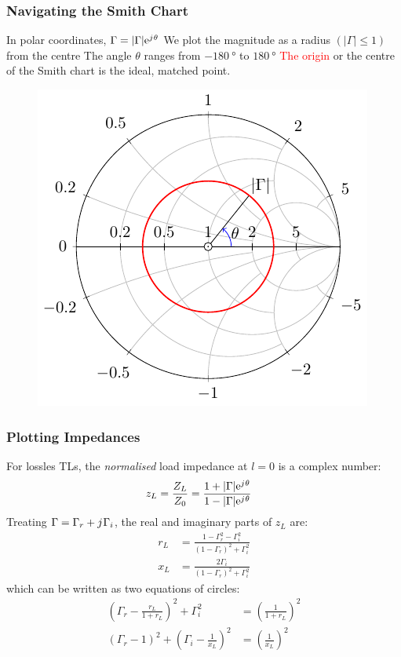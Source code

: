 \documentclass[10pt, compress]{beamer}
\newcommand{\e}{\mathrm{e}} %
\renewcommand{\j}{{j}\mkern1mu} %
\begin{document}
\begin{frame}
    \frametitle{Navigating the Smith Chart}
    \begin{outline}
        \1 In polar coordinates, $\Gamma = |\Gamma| \e^{\j \theta}$
        \1 We plot the magnitude as a radius $(|\Gamma| \le 1)$ from the centre
        \1 The angle $\theta$ ranges from $\SI{-180}{\degree}$ to $\SI{180}{\degree}$
        \1 \textcolor{red}{The origin} or the centre of the Smith chart is the ideal, matched point.
    \end{outline}
    \begin{figure}[htbp]
        \centering
        \includegraphics[width=.5\textwidth]{smith_simple_gamme.pdf}
    \end{figure}
\end{frame}

\begin{frame}
    \frametitle{Plotting Impedances}
    For lossles TLs, the \textit{normalised} load impedance at $l = 0$ is a complex number:
    \begin{align*}
        z_L  = \frac{Z_L}{Z_0} & = \frac{1 + |\Gamma|\e^{\j \theta}}{1 - |\Gamma|\e^{\j \theta}}
    \end{align*}
    Treating $\Gamma = \Gamma_r + \j \Gamma_i$, the real and imaginary parts of $z_L$ are:
    \begin{align*}
        r_{L} & = \frac{1-\Gamma_{r}^{2}-\Gamma_{i}^{2}}{\left(1-\Gamma_{r}\right)^{2}+\Gamma_{i}^{2}} \\
        x_{L} & = \frac{2 \Gamma_{i}}{\left(1-\Gamma_{r}\right)^{2}+\Gamma_{i}^{2}}
    \end{align*}
    which can be written as two equations of circles:
    \begin{align*}
        \left(\Gamma_{r} - \frac{r_{L}}{1+r_{L}}\right)^{2} + \Gamma_{i}^{2}      & = \left(\frac{1}{1+r_{L}}\right)^{2} \tag{Resistance Circle} \\
        \left(\Gamma_{r}-1\right)^{2}+\left(\Gamma_{i}-\frac{1}{x_{L}}\right)^{2} & =\left(\frac{1}{x_{L}}\right)^{2} \tag{Reactance Circle}
    \end{align*}
\end{frame}
\end{document}
